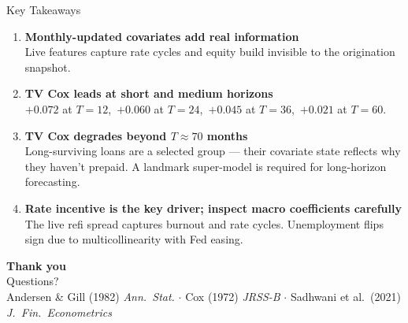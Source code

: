\documentclass[10pt,aspectratio=169]{beamer}
\begin{document}
\begin{frame}{Key Takeaways}
    \begin{enumerate}\itemsep8pt
        \item \textbf{Monthly-updated covariates add real information}\\
              \small Live features capture rate cycles and equity build invisible to the origination snapshot.

        \item \textbf{TV Cox leads at short and medium horizons}\\
              \small $+0.072$ at $T=12$,\ $+0.060$ at $T=24$,\ $+0.045$ at $T=36$,\ $+0.021$ at $T=60$.

        \item \textbf{TV Cox degrades beyond $T\approx70$ months}\\
              \small Long-surviving loans are a selected group --- their covariate state reflects why they haven't prepaid.
              A landmark super-model is required for long-horizon forecasting.

        \item \textbf{Rate incentive is the key driver; inspect macro coefficients carefully}\\
              \small The live refi spread captures burnout and rate cycles.
              Unemployment flips sign due to multicollinearity with Fed easing.
    \end{enumerate}
\end{frame}

\begin{frame}[plain]
    \vspace*{2em}
    \begin{center}
        {\Huge \textbf{Thank you}}\\[1.5em]
        {\Large Questions?}\\[2.5em]
        \small
        Andersen \& Gill (1982) \textit{Ann.\ Stat.} $\cdot$
        Cox (1972) \textit{JRSS-B} $\cdot$
        Sadhwani et al.\ (2021) \textit{J.\ Fin.\ Econometrics}
    \end{center}
\end{frame}
\end{document}
